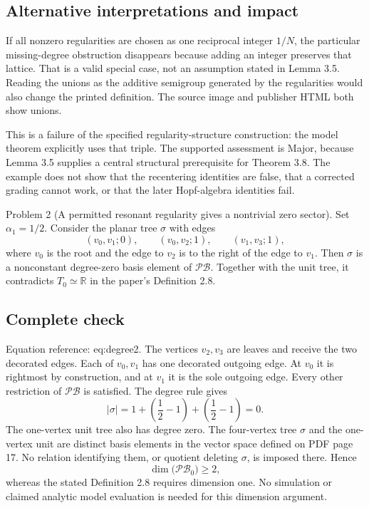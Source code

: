 \documentclass[10pt]{article}
\begin{document}
\subsection*{Alternative interpretations and impact}
If all nonzero regularities are chosen as one reciprocal integer \(1/N\), the particular missing-degree obstruction disappears because adding an integer preserves that lattice. That is a valid special case, not an assumption stated in Lemma 3.5. Reading the unions as the additive semigroup generated by the regularities would also change the printed definition. The source image and publisher HTML both show unions.\par
This is a failure of the specified regularity-structure construction: the model theorem explicitly uses that triple. The supported assessment is Major, because Lemma 3.5 supplies a central structural prerequisite for Theorem 3.8. The example does not show that the recentering identities are false, that a corrected grading cannot work, or that the later Hopf-algebra identities fail.\par
Problem 2 (A permitted resonant regularity gives a nontrivial zero sector).  Set \(\alpha_1=1/2\). Consider the planar tree \(\sigma\) with edges \[(v_0,v_1;0),\qquad (v_0,v_2;1),\qquad (v_1,v_3;1),\] where \(v_0\) is the root and the edge to \(v_2\) is to the right of the edge to \(v_1\). Then \(\sigma\) is a nonconstant degree-zero basis element of \(\mathcal{PB}\). Together with the unit tree, it contradicts \(T_0\simeq\mathbb R\) in the paper’s Definition 2.8.\par
\subsection*{Complete check}
Equation reference: eq:degree2. The vertices \(v_2,v_3\) are leaves and receive the two decorated edges. Each of \(v_0,v_1\) has one decorated outgoing edge. At \(v_0\) it is rightmost by construction, and at \(v_1\) it is the sole outgoing edge. Every other restriction of \(\mathcal{PB}\) is satisfied. The degree rule gives \[
 |\sigma|=1+\left(\frac12-1\right)+
                 \left(\frac12-1\right)=0.\] The one-vertex unit tree also has degree zero. The four-vertex tree \(\sigma\) and the one-vertex unit are distinct basis elements in the vector space defined on PDF page 17. No relation identifying them, or quotient deleting \(\sigma\), is imposed there. Hence \[\dim\bigl(\mathcal{PB}_0\bigr)\ge 2,\] whereas the stated Definition 2.8 requires dimension one. No simulation or claimed analytic model evaluation is needed for this dimension argument.\par
\end{document}
